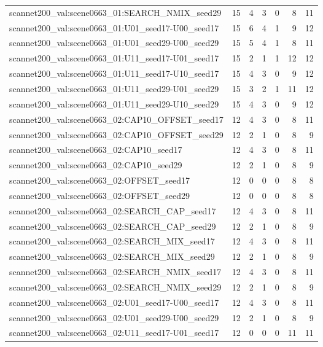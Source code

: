 \begin{table}[t]
\begin{tabular}{lrrrrrr}
scannet200\_val:scene0663\_01:SEARCH\_NMIX\_seed29 & 15 & 4 & 3 & 0 & 8 & 11 \\
scannet200\_val:scene0663\_01:U01\_seed17-U00\_seed17 & 15 & 6 & 4 & 1 & 9 & 12 \\
scannet200\_val:scene0663\_01:U01\_seed29-U00\_seed29 & 15 & 5 & 4 & 1 & 8 & 11 \\
scannet200\_val:scene0663\_01:U11\_seed17-U01\_seed17 & 15 & 2 & 1 & 1 & 12 & 12 \\
scannet200\_val:scene0663\_01:U11\_seed17-U10\_seed17 & 15 & 4 & 3 & 0 & 9 & 12 \\
scannet200\_val:scene0663\_01:U11\_seed29-U01\_seed29 & 15 & 3 & 2 & 1 & 11 & 12 \\
scannet200\_val:scene0663\_01:U11\_seed29-U10\_seed29 & 15 & 4 & 3 & 0 & 9 & 12 \\
scannet200\_val:scene0663\_02:CAP10\_OFFSET\_seed17 & 12 & 4 & 3 & 0 & 8 & 11 \\
scannet200\_val:scene0663\_02:CAP10\_OFFSET\_seed29 & 12 & 2 & 1 & 0 & 8 & 9 \\
scannet200\_val:scene0663\_02:CAP10\_seed17 & 12 & 4 & 3 & 0 & 8 & 11 \\
scannet200\_val:scene0663\_02:CAP10\_seed29 & 12 & 2 & 1 & 0 & 8 & 9 \\
scannet200\_val:scene0663\_02:OFFSET\_seed17 & 12 & 0 & 0 & 0 & 8 & 8 \\
scannet200\_val:scene0663\_02:OFFSET\_seed29 & 12 & 0 & 0 & 0 & 8 & 8 \\
scannet200\_val:scene0663\_02:SEARCH\_CAP\_seed17 & 12 & 4 & 3 & 0 & 8 & 11 \\
scannet200\_val:scene0663\_02:SEARCH\_CAP\_seed29 & 12 & 2 & 1 & 0 & 8 & 9 \\
scannet200\_val:scene0663\_02:SEARCH\_MIX\_seed17 & 12 & 4 & 3 & 0 & 8 & 11 \\
scannet200\_val:scene0663\_02:SEARCH\_MIX\_seed29 & 12 & 2 & 1 & 0 & 8 & 9 \\
scannet200\_val:scene0663\_02:SEARCH\_NMIX\_seed17 & 12 & 4 & 3 & 0 & 8 & 11 \\
scannet200\_val:scene0663\_02:SEARCH\_NMIX\_seed29 & 12 & 2 & 1 & 0 & 8 & 9 \\
scannet200\_val:scene0663\_02:U01\_seed17-U00\_seed17 & 12 & 4 & 3 & 0 & 8 & 11 \\
scannet200\_val:scene0663\_02:U01\_seed29-U00\_seed29 & 12 & 2 & 1 & 0 & 8 & 9 \\
scannet200\_val:scene0663\_02:U11\_seed17-U01\_seed17 & 12 & 0 & 0 & 0 & 11 & 11 \\

\end{tabular}
\end{table}
